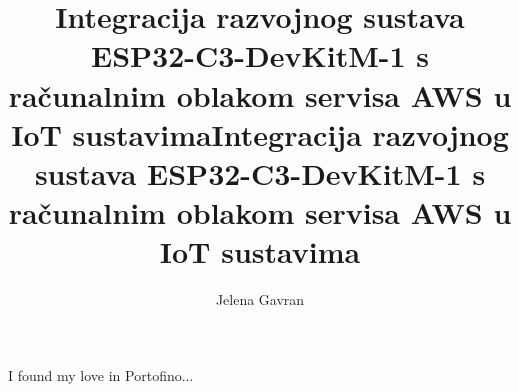 \documentclass[times, utf8, seminar, numeric]{fer}
\renewcommand*\lstlistlistingname{Popis isječaka koda}
\begin{document}
	
	\title{Integracija razvojnog sustava ESP32-C3-DevKitM-1 s računalnim oblakom servisa AWS u IoT sustavima}
	
	\author{Jelena Gavran}
	
	
	\maketitle
	
	\tableofcontents
	
	\begingroup
	\renewcommand*\listfigurename{Popis slika}
	\listoffigures
	\endgroup
	
	
	
	
	
	
	
	
	
	
	
	
	\title{Integracija razvojnog sustava ESP32-C3-DevKitM-1 s računalnim oblakom servisa AWS u IoT sustavima}
	\begin{sazetak}
		I found my love in Portofino...
		
	\end{sazetak}
	
\end{document}
